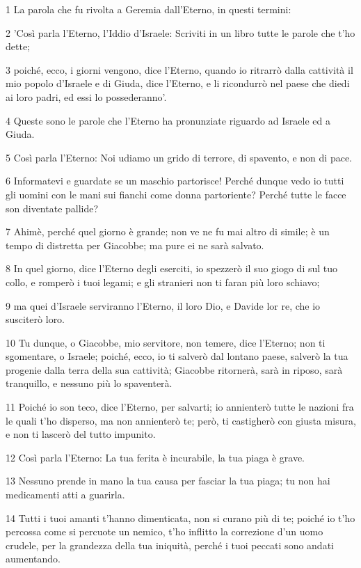 \par 1 La parola che fu rivolta a Geremia dall'Eterno, in questi termini:
\par 2 'Così parla l'Eterno, l'Iddio d'Israele: Scriviti in un libro tutte le parole che t'ho dette;
\par 3 poiché, ecco, i giorni vengono, dice l'Eterno, quando io ritrarrò dalla cattività il mio popolo d'Israele e di Giuda, dice l'Eterno, e li ricondurrò nel paese che diedi ai loro padri, ed essi lo possederanno'.
\par 4 Queste sono le parole che l'Eterno ha pronunziate riguardo ad Israele ed a Giuda.
\par 5 Così parla l'Eterno: Noi udiamo un grido di terrore, di spavento, e non di pace.
\par 6 Informatevi e guardate se un maschio partorisce! Perché dunque vedo io tutti gli uomini con le mani sui fianchi come donna partoriente? Perché tutte le facce son diventate pallide?
\par 7 Ahimè, perché quel giorno è grande; non ve ne fu mai altro di simile; è un tempo di distretta per Giacobbe; ma pure ei ne sarà salvato.
\par 8 In quel giorno, dice l'Eterno degli eserciti, io spezzerò il suo giogo di sul tuo collo, e romperò i tuoi legami; e gli stranieri non ti faran più loro schiavo;
\par 9 ma quei d'Israele serviranno l'Eterno, il loro Dio, e Davide lor re, che io susciterò loro.
\par 10 Tu dunque, o Giacobbe, mio servitore, non temere, dice l'Eterno; non ti sgomentare, o Israele; poiché, ecco, io ti salverò dal lontano paese, salverò la tua progenie dalla terra della sua cattività; Giacobbe ritornerà, sarà in riposo, sarà tranquillo, e nessuno più lo spaventerà.
\par 11 Poiché io son teco, dice l'Eterno, per salvarti; io annienterò tutte le nazioni fra le quali t'ho disperso, ma non annienterò te; però, ti castigherò con giusta misura, e non ti lascerò del tutto impunito.
\par 12 Così parla l'Eterno: La tua ferita è incurabile, la tua piaga è grave.
\par 13 Nessuno prende in mano la tua causa per fasciar la tua piaga; tu non hai medicamenti atti a guarirla.
\par 14 Tutti i tuoi amanti t'hanno dimenticata, non si curano più di te; poiché io t'ho percossa come si percuote un nemico, t'ho inflitto la correzione d'un uomo crudele, per la grandezza della tua iniquità, perché i tuoi peccati sono andati aumentando.
